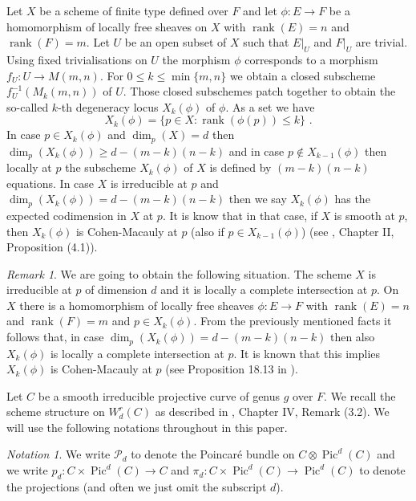 \documentclass{article}
\DeclareMathOperator{\Pic}{Pic}
\DeclareMathOperator{\rk}{rank}
\theoremstyle{definition}
\theoremstyle{remark}
\newtheorem{notation}{Notation}
\newtheorem{remark}{Remark}
\begin{document}
Let $X$ be a scheme of finite type defined over $F$ and let $\phi : E \rightarrow F$ be a homomorphism of locally free sheaves on $X$ with $\rk (E)=n$ and $\rk (F)=m$.
Let $U$ be an open subset of $X$ such that $E \vert _U$ and $F \vert _U$ are trivial.
Using fixed trivialisations on $U$ the morphism $\phi$ corresponds to a morphism $f_U :  U \rightarrow M(m,n)$.
For $0 \leq k \leq \min \{ m,n \}$ we obtain a closed subscheme $f_U^{-1}(M_k(m,n))$ of $U$.
Those closed subschemes patch together to obtain the so-called $k$-th degeneracy locus $X_k(\phi)$ of $\phi$.
As a set we have
\[
X_k (\phi) = \{ p \in X : \rk (\phi (p))\leq k \} \text { .}
\]
In case $p \in X_k(\phi)$ and $\dim _p(X)=d$ then $\dim _p(X_k(\phi)) \geq d-(m-k)(n-k)$ and in case $p \notin X_{k-1}(\phi)$ then locally at $p$ the subscheme $X_k(\phi)$ of $X$ is defined by $(m-k)(n-k)$ equations.
In case $X$ is irreducible at $p$ and $\dim _p(X_k(\phi))=d-(m-k)(n-k)$ then we say $X_k(\phi)$ has the expected codimension in $X$ at $p$.
It is know that in that case, if $X$ is smooth at $p$, then $X_k(\phi)$ is Cohen-Macauly at $p$ (also if $p \in X_{k-1}(\phi)$) (see \cite{ref9}, Chapter II, Proposition (4.1)).

\begin{remark}\label{rem1.1}
We are going to obtain the following situation.
The scheme $X$ is irreducible at $p$ of dimension $d$ and it is locally a complete intersection at $p$.
On $X$ there is a homomorphism of locally free sheaves $\phi : E \rightarrow F$ with $\rk (E)=n$ and $\rk (F)=m$ and $p \in X_k(\phi)$.
From the previously mentioned facts it follows that, in case $\dim _p(X_k(\phi))=d-(m-k)(n-k)$ then also $X_k(\phi)$ is locally a complete intersection at $p$.
It is known that this implies $X_k(\phi)$ is Cohen-Macauly at $p$ (see Proposition 18.13 in \cite{ref5}).
\end{remark}

Let $C$ be a smooth irreducible projective curve of genus $g$ over $F$.
We recall the scheme structure on $W^r_d(C)$ as described in \cite {ref9}, Chapter IV, Remark (3.2).
We will use the following notations throughout in this paper.

\begin{notation}\label{not1.1}
We write $\mathcal{P}_d$ to denote the Poincar\'e bundle on $C \otimes \Pic ^d(C)$ and we write $p_d : C \times \Pic ^d(C) \rightarrow C$ and $\pi _d : C \times \Pic ^d(C) \rightarrow \Pic ^d(C)$ to denote the projections (and often we just omit the subscript $d$).
\end{notation}
\end{document}
